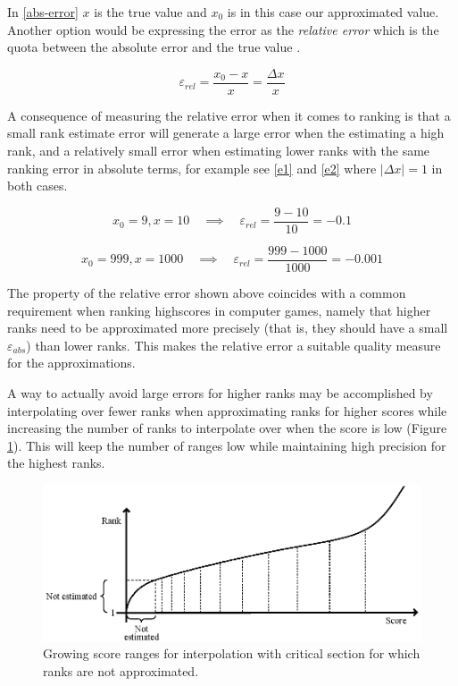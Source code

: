 In \ref{abs-error} $x$ is the true value and $x_0$ is in this case our approximated value. Another option would be expressing the error as the \emph{relative error} which is the quota between the absolute error and the true value \cite{pohl}.

\begin{equation}
  \label{rel-error}
  \varepsilon_{rel} = \frac{x_0 - x}{x} = \frac{\Delta x}{x} 
\end{equation}

A consequence of measuring the relative error when it comes to ranking is that a small rank estimate error will generate a large error when the estimating a high rank, and a relatively small error when estimating lower ranks with the same ranking error in absolute terms, for example see \ref{e1} and \ref{e2} where $|\Delta x| = 1$ in both cases.

\begin{equation}
  \label{e1}
x_0 = 9, x = 10 \quad \implies \quad \varepsilon_{rel} = \frac{9 - 10}{10} = -0.1  
\end{equation}

\begin{equation}
  \label{e2}
x_0 = 999, x = 1000 \quad \implies \quad \varepsilon_{rel} = \frac{999 - 1000}{1000} = -0.001  
  \end{equation}

The property of the relative error shown above coincides with a common requirement when ranking highscores in computer games, namely that higher ranks need to be approximated more precisely (that is, they should have a small $\varepsilon_{abs}$) than lower ranks. This makes the relative error a suitable quality measure for the approximations.

A way to actually avoid large errors for higher ranks may be accomplished by interpolating over fewer ranks when approximating ranks for higher scores while  increasing the number of ranks to interpolate over when the score is low (Figure \ref{fig:growing}).  This will keep the number of ranges low while maintaining high precision for the highest ranks.

\begin{figure}[h!]
  \centering
  \caption{Growing score ranges for interpolation with critical section for which ranks are not approximated.}
  \label{fig:growing}
  \includegraphics[width=13cm]{img/growing_bucket_sizes.eps}
\end{figure}

